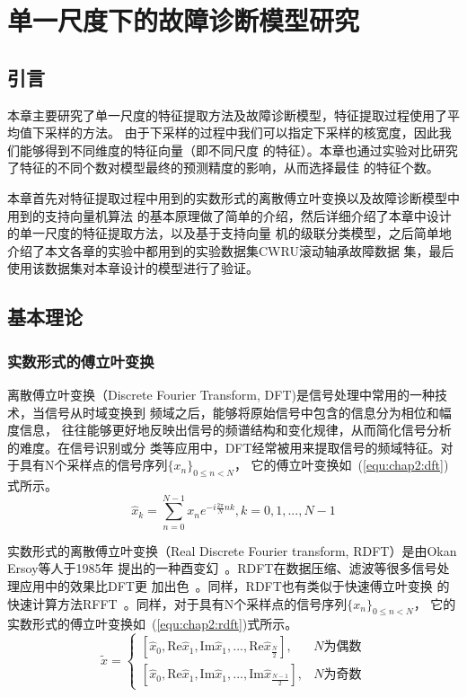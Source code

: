 \chapter{单一尺度下的故障诊断模型研究}
\label{cha:chapter2}

\section{引言}

本章主要研究了单一尺度的特征提取方法及故障诊断模型，特征提取过程使用了平均值下采样的方法。
由于下采样的过程中我们可以指定下采样的核宽度，因此我们能够得到不同维度的特征向量（即不同尺度
的特征）。本章也通过实验对比研究了特征的不同个数对模型最终的预测精度的影响，从而选择最佳
的特征个数。

本章首先对特征提取过程中用到的实数形式的离散傅立叶变换以及故障诊断模型中用到的支持向量机算法
的基本原理做了简单的介绍，然后详细介绍了本章中设计的单一尺度的特征提取方法，以及基于支持向量
机的级联分类模型，之后简单地介绍了本文各章的实验中都用到的实验数据集CWRU滚动轴承故障数据
集，最后使用该数据集对本章设计的模型进行了验证。

\section{基本理论}

\subsection{实数形式的傅立叶变换}
\label{subsection:rdft}

离散傅立叶变换（Discrete Fourier Transform, DFT)是信号处理中常用的一种技术，当信号从时域变换到
频域之后，能够将原始信号中包含的信息分为相位和幅度信息，
往往能够更好地反映出信号的频谱结构和变化规律，从而简化信号分析的难度。在信号识别或分
类等应用中，DFT经常被用来提取信号的频域特征。对于具有N个采样点的信号序列$\{x_n\}_{0\leq n < N}$，
它的傅立叶变换如~(\ref{equ:chap2:dft})式所示。
\begin{equation}
\label{equ:chap2:dft}
  \hat{x}_k=\sum_{n=0}^{N-1}x_n e^{-i\frac{2\pi}{N}nk}, k=0,1,...,N-1
\end{equation}

实数形式的离散傅立叶变换（Real Discrete Fourier transform, RDFT）是由Okan Ersoy等人于1985年
提出的一种酉变幻~\cite{ersoy1985real}。RDFT在数据压缩、滤波等很多信号处理应用中的效果比DFT更
加出色~\cite{ersoy1988fast}。同样，RDFT也有类似于快速傅立叶变换
的快速计算方法RFFT~\cite{ersoy1988fast}。同样，对于具有N个采样点的信号序列$\{x_n\}_{0\leq n < N}$，
它的实数形式的傅立叶变换如~(\ref{equ:chap2:rdft})式所示。
\begin{equation}
\label{equ:chap2:rdft}
  \widetilde{x}=
  \begin{cases}
    \left[\hat{x}_0, \text{Re}\hat{x}_1, \text{Im}\hat{x}_1, ..., \text{Re}\hat{x}_{\frac{N}{2}}\right],  & N\text{为偶数}\\
    \left[\hat{x}_0, \text{Re}\hat{x}_1, \text{Im}\hat{x}_1, ..., \text{Im}\hat{x}_{\frac{N-1}{2}}\right],& N\text{为奇数}
  \end{cases}
\end{equation}

